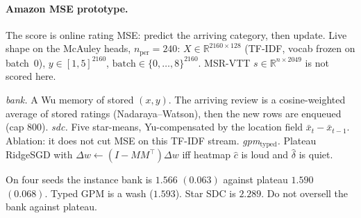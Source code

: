 
\paragraph{Amazon MSE prototype.}
The score is online rating MSE: predict the arriving category, then update.
Live shape on the McAuley heads, $n_{\mathrm{per}}=240$:
$X\in\mathbb{R}^{2160\times 128}$ (TF-IDF, vocab frozen on batch~0),
$y\in[1,5]^{2160}$, $\mathrm{batch}\in\{0,\ldots,8\}^{2160}$.
MSR-VTT $s\in\mathbb{R}^{n\times 2049}$ is not scored here.

\emph{bank.}
A Wu memory of stored $(x,y)$. The arriving review is a cosine-weighted
average of stored ratings (Nadaraya--Watson), then the new rows are
enqueued (cap $800$).
\emph{sdc.}
Five star-means, Yu-compensated by the location field
$\bar x_t-\bar x_{t-1}$. Ablation: it does not cut MSE on this TF-IDF stream.
\emph{gpm$_{\mathrm{typed}}$.}
Plateau RidgeSGD with $\Delta w\leftarrow(I-MM^\top)\Delta w$ iff heatmap
$\hat c$ is loud and $\hat\delta$ is quiet.

On four seeds the instance bank is $1.566$ $(0.063)$ against plateau
$1.590$ $(0.068)$. Typed GPM is a wash ($1.593$). Star SDC is $2.289$.
Do not oversell the bank against plateau.
